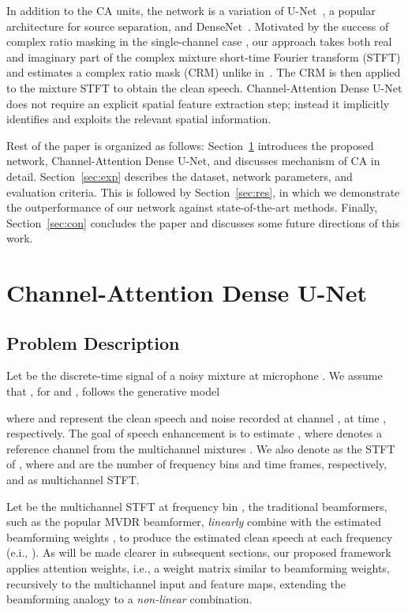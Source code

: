 \documentclass{article}
\begin{document}
In addition to the CA units, the network is a variation of U-Net~\cite{unet}, a popular architecture for source separation, and DenseNet~\cite{denseNet}. Motivated by the success of complex ratio masking in the single-channel case \cite{crm}, our approach takes both real and imaginary part of the complex mixture short-time Fourier transform (STFT) and estimates a complex ratio mask (CRM) unlike in~\cite{wang2018multi, TFmask}. The CRM is then applied to the mixture STFT to obtain the clean speech. Channel-Attention Dense U-Net does not require an explicit spatial feature extraction step; instead it implicitly identifies and exploits the relevant spatial information.

Rest of the paper is organized as follows: Section~\ref{sec:saunet} introduces the proposed network, Channel-Attention Dense U-Net, and discusses mechanism of CA in detail. Section~\ref{sec:exp} describes the dataset, network parameters, and evaluation criteria. This is followed by Section~\ref{sec:res}, in which we demonstrate the outperformance of our network against state-of-the-art methods. Finally, Section~\ref{sec:con} concludes the paper and discusses some future directions of this work.





\section{Channel-Attention Dense U-Net}
\label{sec:saunet}
\subsection{Problem Description}
\label{sec:model}
Let  be the discrete-time signal of a noisy mixture at microphone . We assume that , for  and , follows the generative model

\noindent where  and  represent the clean speech and noise recorded at channel , at time , respectively. The goal of speech enhancement is to estimate , where  denotes a reference channel from the multichannel mixtures . We also denote  as the STFT of , where  and  are the number of frequency bins and time frames, respectively, and  as multichannel STFT.

Let  be the multichannel STFT at frequency bin , the traditional beamformers, such as the popular MVDR beamformer, \emph{linearly} combine  with the estimated beamforming weights , to produce the estimated clean speech  at each frequency  (e.i., ). As will be made clearer in subsequent sections, our proposed framework applies attention weights, i.e., a weight matrix similar to beamforming weights, recursively to the multichannel input and feature maps, extending the beamforming analogy to a \emph{non-linear} combination.
\vspace{-2mm}
\end{document}
